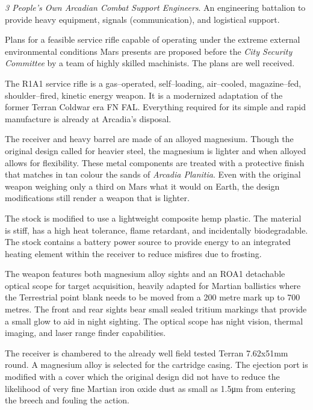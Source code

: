 \item {\it 3 People's Own Arcadian Combat Support Engineers}. An engineering battalion to provide heavy equipment, signals (communication), and logistical support.
\stopitemize
\StopTimelineDate

Plans for a feasible service rifle capable of operating under the extreme external environmental conditions Mars presents are proposed before the {\it City Security Committee} by a team of highly skilled machinists. The plans are well received. 

The R1A1 service rifle is a gas--operated, self--loading, air--cooled, magazine--fed, shoulder--fired, kinetic energy weapon. It is a modernized adaptation of the former Terran Coldwar era FN FAL. Everything required for its simple and rapid manufacture is already at Arcadia's disposal.

The receiver and heavy barrel are made of an alloyed magnesium. Though the original design called for heavier steel, the magnesium is lighter and when alloyed allows for flexibility. These metal components are treated with a protective finish that matches in tan colour the sands of {\it Arcadia Planitia}. Even with the original weapon weighing only a third on Mars what it would on Earth, the design modifications still render a weapon that is lighter.

The stock is modified to use a lightweight composite hemp plastic. The material is stiff, has a high heat tolerance, flame retardant, and incidentally biodegradable. The stock contains a battery power source to provide energy to an integrated heating element within the receiver to reduce misfires due to frosting.

The weapon features both magnesium alloy sights and an ROA1 detachable optical scope for target acquisition, heavily adapted for Martian ballistics where the Terrestrial point blank needs to be moved from a 200 metre mark up to 700 metres. The front and rear sights bear small sealed tritium markings that provide a small glow to aid in night sighting. The optical scope has night vision, thermal imaging, and laser range finder capabilities.

The receiver is chambered to the already well field tested Terran 7.62x51mm round. A magnesium alloy is selected for the cartridge casing. The ejection port is modified with a cover which the original design did not have to reduce the likelihood of very fine Martian iron oxide dust as small as 1.5μm from entering the breech and fouling the action.

